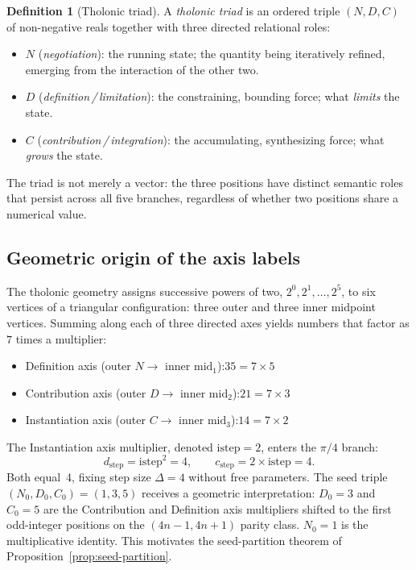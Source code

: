 \documentclass[12pt]{article}
\theoremstyle{definition}
\newtheorem{definition}[theorem]{Definition}
\theoremstyle{remark}
\begin{document}
\begin{definition}[Tholonic triad]\label{def:triad}
A \emph{tholonic triad} is an ordered triple $(N, D, C)$ of non-negative reals together
with three directed relational roles:
\begin{itemize}
  \item $N$ (\emph{negotiation}): the running state; the quantity being iteratively
        refined, emerging from the interaction of the other two.
  \item $D$ (\emph{definition\,/\,limitation}): the constraining, bounding force; what
        \emph{limits} the state.
  \item $C$ (\emph{contribution\,/\,integration}): the accumulating, synthesizing force;
        what \emph{grows} the state.
\end{itemize}
The triad is not merely a vector: the three positions have distinct semantic roles that
persist across all five branches, regardless of whether two positions share a numerical value.
\end{definition}

\subsection{Geometric origin of the axis labels}\label{subsec:geometry}

The tholonic geometry assigns successive powers of two, $2^0, 2^1, \ldots, 2^5$, to six
vertices of a triangular configuration: three outer and three inner midpoint vertices.
Summing along each of three directed axes yields numbers that factor as $7$ times a multiplier:
\begin{itemize}
  \item Definition axis (outer $N \to$ inner $\mathrm{mid}_1$):\quad $35 = 7 \times 5$
  \item Contribution axis (outer $D \to$ inner $\mathrm{mid}_2$):\quad $21 = 7 \times 3$
  \item Instantiation axis (outer $C \to$ inner $\mathrm{mid}_3$):\quad $14 = 7 \times 2$
\end{itemize}
The Instantiation axis multiplier, denoted $\mathrm{istep} = 2$, enters the $\pi/4$ branch:
\[
  d_{\mathrm{step}} = \mathrm{istep}^2 = 4,\qquad c_{\mathrm{step}} = 2 \times \mathrm{istep} = 4.
\]
Both equal~$4$, fixing step size $\Delta = 4$ without free parameters. The seed triple
$(N_0, D_0, C_0) = (1, 3, 5)$ receives a geometric interpretation: $D_0 = 3$ and $C_0 = 5$
are the Contribution and Definition axis multipliers shifted to the first odd-integer
positions on the $(4n-1, 4n+1)$ parity class. $N_0 = 1$ is the multiplicative identity.
This motivates the seed-partition theorem of Proposition~\ref{prop:seed-partition}.
\end{document}
